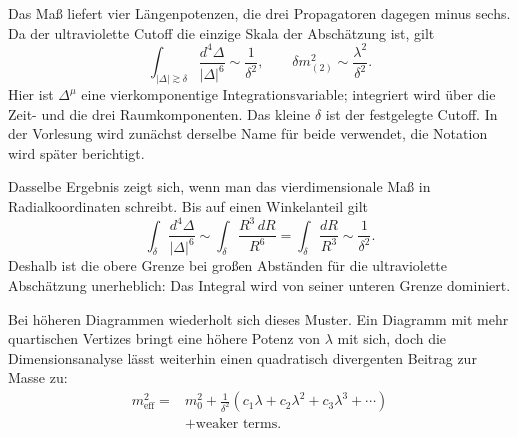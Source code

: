 \begin{classroomqa}\end{classroomqa}

Das Maß liefert vier Längenpotenzen, die drei Propagatoren dagegen minus sechs. Da der ultraviolette Cutoff die einzige Skala der Abschätzung ist, gilt \begin{equation}
\int_{|\Delta|\gtrsim\delta}
\frac{d^4\Delta}{|\Delta|^6}
\sim\frac{1}{\delta^2},
\qquad
\delta m^2_{(2)}
\sim\frac{\lambda^2}{\delta^2}.
\label{eq:two-loop-scalar-mass}
\end{equation}Hier ist \(\Delta^\mu\) eine vierkomponentige Integrationsvariable; integriert wird über die Zeit- und die drei Raumkomponenten. Das kleine \(\delta\) ist der festgelegte Cutoff. In der Vorlesung wird zunächst derselbe Name für beide verwendet, die Notation wird später berichtigt.

Dasselbe Ergebnis zeigt sich, wenn man das vierdimensionale Maß in Radialkoordinaten schreibt. Bis auf einen Winkelanteil gilt \begin{equation}
\int_{\delta}\frac{d^4\Delta}{|\Delta|^6}
\sim
\int_{\delta}\frac{R^3\,dR}{R^6}
=\int_{\delta}\frac{dR}{R^3}
\sim\frac{1}{\delta^2}.
\end{equation}Deshalb ist die obere Grenze bei großen Abständen für die ultraviolette Abschätzung unerheblich: Das Integral wird von seiner unteren Grenze dominiert.

Bei höheren Diagrammen wiederholt sich dieses Muster. Ein Diagramm mit mehr quartischen Vertizes bringt eine höhere Potenz von \(\lambda\) mit sich, doch die Dimensionsanalyse lässt weiterhin einen quadratisch divergenten Beitrag zur Masse zu: \begin{equation}
\begin{aligned}
m_{\mathrm{eff}}^2
={}&m_0^2
+\frac{1}{\delta^2}
\left(c_1\lambda+c_2\lambda^2+c_3\lambda^3+\cdots\right)\\
&+\text{weaker terms}.
\end{aligned}
\label{eq:scalar-mass-series}
\end{equation}


